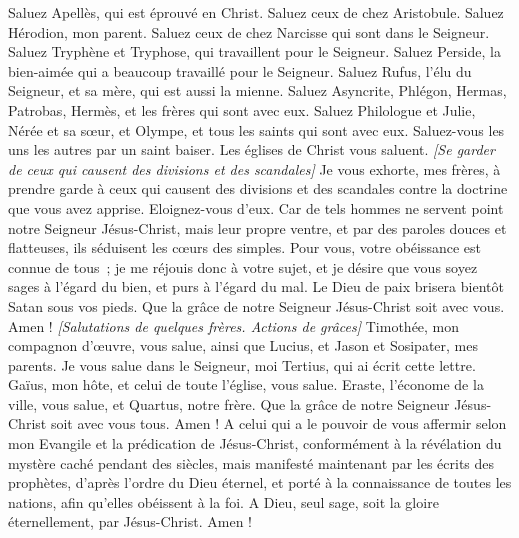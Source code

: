 \begin{multicols}{2}
Saluez Apellès, qui est éprouvé en Christ. Saluez ceux de chez Aristobule.
Saluez Hérodion, mon parent. Saluez ceux de chez Narcisse qui sont dans le Seigneur.
Saluez Tryphène et Tryphose, qui travaillent pour le Seigneur. Saluez Perside, la bien-aimée qui a beaucoup travaillé pour le Seigneur.
Saluez Rufus, l’élu du Seigneur, et sa mère, qui est aussi la mienne.
Saluez Asyncrite, Phlégon, Hermas, Patrobas, Hermès, et les frères qui sont avec eux.
Saluez Philologue et Julie, Nérée et sa sœur, et Olympe, et tous les saints qui sont avec eux.
Saluez-vous les uns les autres par un saint baiser. Les églises de Christ vous saluent.
\textit{[Se garder de ceux qui causent des divisions et des scandales]}
Je vous exhorte, mes frères, à prendre garde à ceux qui causent des divisions et des scandales contre la doctrine que vous avez apprise. Eloignez-vous d'eux.
Car de tels hommes ne servent point notre Seigneur Jésus-Christ, mais leur propre ventre, et par des paroles douces et flatteuses, ils séduisent les cœurs des simples.
Pour vous, votre obéissance est connue de tous ; je me réjouis donc à votre sujet, et je désire que vous soyez sages à l’égard du bien, et purs à l’égard du mal.
Le Dieu de paix brisera bientôt Satan sous vos pieds. Que la grâce de notre Seigneur Jésus-Christ soit avec vous. Amen !
\textit{[Salutations de quelques frères. Actions de grâces]}
Timothée, mon compagnon d’œuvre, vous salue, ainsi que Lucius, et Jason et Sosipater, mes parents.
Je vous salue dans le Seigneur, moi Tertius, qui ai écrit cette lettre.
Gaïus, mon hôte, et celui de toute l'église, vous salue. Eraste, l’économe de la ville, vous salue, et Quartus, notre frère.
Que la grâce de notre Seigneur Jésus-Christ soit avec vous tous. Amen !
A celui qui a le pouvoir de vous affermir selon mon Evangile et la prédication de Jésus-Christ, conformément à la révélation du mystère caché pendant des siècles,
mais manifesté maintenant par les écrits des prophètes, d’après l’ordre du Dieu éternel, et porté à la connaissance de toutes les nations, afin qu’elles obéissent à la foi.
A Dieu, seul sage, soit la gloire éternellement, par Jésus-Christ. Amen !
\PPE{}
\end{multicols}
